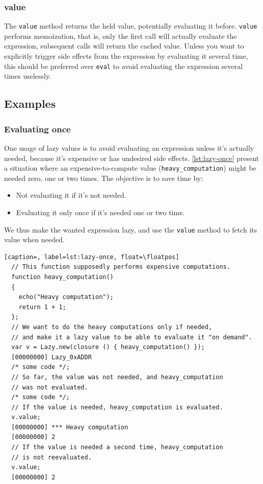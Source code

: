 \documentclass[openright,twoside,12pt]{report}
\newcommand   {\floatpos}          {htbp}
\newcommand{\lst}[1]{\autoref{lst:#1}}
\begin{document}
\subsubsection{value}

The \lstinline|value| method returns the held value, potentially
evaluating it before. \lstinline|value| performs memoization, that is,
only the first call will actually evaluate the expression, subsequent
calls will return the cached value. Unless you want to explicitly
trigger side effects from the expression by evaluating it several
time, this should be preferred over \lstinline|eval| to avoid
evaluating the expression several times uselessly.

\subsection{Examples}

\subsubsection{Evaluating once}

One usage of lazy values is to avoid evaluating an expression unless
it's actually needed, because it's expensive or has undesired side
effects. \lst{lazy-once} present a situation where an
expensive-to-compute value (\lstinline|heavy_computation|) might be
needed zero, one or two times. The objective is to save time by:

\begin{itemize}
\item Not evaluating it if it's not needed.
\item Evaluating it only once if it's needed one or two time.
\end{itemize}

We thus make the wanted expression lazy, and use the \lstinline|value|
method to fetch its value when needed.

\begin{lstlisting}[caption=, label=lst:lazy-once, float=\floatpos]
  // This function supposedly performs expensive computations.
  function heavy_computation()
  {
    echo("Heavy computation");
    return 1 + 1;
  };
  // We want to do the heavy computations only if needed,
  // and make it a lazy value to be able to evaluate it "on demand".
  var v = Lazy.new(closure () { heavy_computation() });
  [00000000] Lazy_0xADDR
  /* some code */;
  // So far, the value was not needed, and heavy_computation
  // was not evaluated.
  /* some code */;
  // If the value is needed, heavy_computation is evaluated.
  v.value;
  [00000000] *** Heavy computation
  [00000000] 2
  // If the value is needed a second time, heavy_computation
  // is not reevaluated.
  v.value;
  [00000000] 2
\end{lstlisting}
\end{document}
